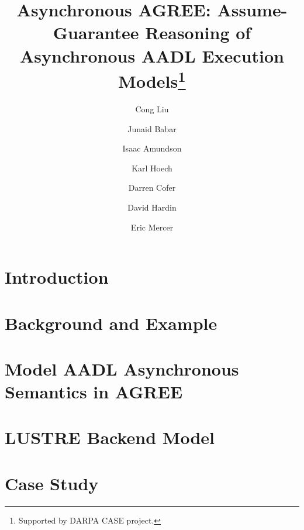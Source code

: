 \documentclass[runningheads]{llncs}
\begin{document}
%
\title{Asynchronous AGREE: Assume-Guarantee Reasoning of Asynchronous AADL Execution Models\thanks{Supported by DARPA CASE project.}}
%
%
\author{
     Cong Liu 
\and Junaid Babar 
\and Isaac Amundson 
\and Karl Hoech 
\and Darren Cofer
\and David Hardin  
\and Eric Mercer}
%
%
%
\maketitle              %
%
\begin{abstract}

\end{abstract}

\section{Introduction}


\section{Background and Example}
\label{example}


\section{Model AADL Asynchronous Semantics in AGREE}
\label{async}


\section{LUSTRE Backend Model}
\label{lustre}


\section{Case Study}
\label{case-study}

\end{document}
